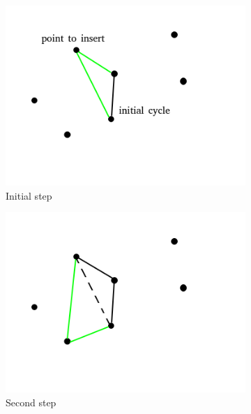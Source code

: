 \begin{figure}[h!]
  \centering
  \begin{subfigure}[b]{0.4\linewidth}
    \includegraphics[width=\linewidth]{media/insertion1.png}
     \caption{Initial step}
  \end{subfigure}
  \begin{subfigure}[b]{0.4\linewidth}
    \includegraphics[width=\linewidth]{media/insertion2.png}
    \caption{Second step}
  \end{subfigure}
  \begin{subfigure}[b]{0.4\linewidth}

\end{subfigure}
\end{figure}
